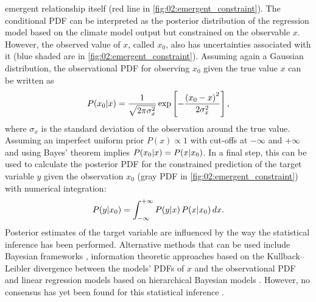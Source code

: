 emergent relationship itself (red line in \cref{fig:02:emergent_constraint}).
The conditional \ac{PDF} can be interpreted as the posterior distribution of
the regression model based on the climate model output but constrained on the
observable $x$. However, the observed value of $x$, called $x_0$, also has
uncertainties associated with it (blue shaded are in
\cref{fig:02:emergent_constraint}). Assuming again a Gaussian distribution, the
observational \ac{PDF} for observing $x_0$ given the true value $x$ can be
written as
\begin{equation}
  P(x_0|x) = \frac{1}{\sqrt{2 \pi \sigma_x^2}} \exp \left[ -\frac{\left(
    x_0 - x \right)^2}{2 \sigma_x^2} \right],
  \label{eq:02:pdf_obs}
\end{equation}
where $\sigma_x$ is the standard deviation of the observation around the true
value. Assuming an imperfect uniform prior $P(x) \propto 1$ with cut-offs at
$-\infty$ and $+\infty$ and using Bayes' theorem implies $P(x_0|x) =
P(x|x_0)$. In a final step, this can be used to calculate the posterior
\ac{PDF} for the constrained prediction of the target variable $y$ given the
observation $x_0$ (gray \ac{PDF} in \cref{fig:02:emergent_constraint}) with
numerical integration:
\begin{equation}
  P(y|x_0) = \int_{-\infty}^{+\infty} P(y|x) \, P(x|x_0) \, d{}x.
  \label{eq:02:pdf_y_given_x0}
\end{equation}
Posterior estimates of the target variable are influenced by the way the
statistical inference has been performed. Alternative methods that can be used
include Bayesian frameworks \autocite{Renoult2020}, information theoretic
approaches based on the Kullback–Leibler divergence between the models'
\acp{PDF} of $x$ and the observational \ac{PDF} \autocite{Brient2016} and
linear regression models based on hierarchical Bayesian models
\autocite{Nijsse2020}. However, no consensus has yet been found for this
statistical inference \autocite{Brient2020}.

